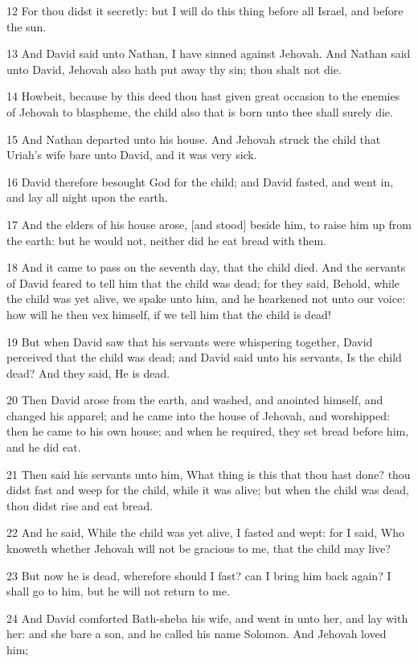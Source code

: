 \par 12 For thou didst it secretly: but I will do this thing before all Israel, and before the sun.
\par 13 And David said unto Nathan, I have sinned against Jehovah. And Nathan said unto David, Jehovah also hath put away thy sin; thou shalt not die.
\par 14 Howbeit, because by this deed thou hast given great occasion to the enemies of Jehovah to blaspheme, the child also that is born unto thee shall surely die.
\par 15 And Nathan departed unto his house. And Jehovah struck the child that Uriah's wife bare unto David, and it was very sick.
\par 16 David therefore besought God for the child; and David fasted, and went in, and lay all night upon the earth.
\par 17 And the elders of his house arose, [and stood] beside him, to raise him up from the earth: but he would not, neither did he eat bread with them.
\par 18 And it came to pass on the seventh day, that the child died. And the servants of David feared to tell him that the child was dead; for they said, Behold, while the child was yet alive, we spake unto him, and he hearkened not unto our voice: how will he then vex himself, if we tell him that the child is dead!
\par 19 But when David saw that his servants were whispering together, David perceived that the child was dead; and David said unto his servants, Is the child dead? And they said, He is dead.
\par 20 Then David arose from the earth, and washed, and anointed himself, and changed his apparel; and he came into the house of Jehovah, and worshipped: then he came to his own house; and when he required, they set bread before him, and he did eat.
\par 21 Then said his servants unto him, What thing is this that thou hast done? thou didst fast and weep for the child, while it was alive; but when the child was dead, thou didst rise and eat bread.
\par 22 And he said, While the child was yet alive, I fasted and wept: for I said, Who knoweth whether Jehovah will not be gracious to me, that the child may live?
\par 23 But now he is dead, wherefore should I fast? can I bring him back again? I shall go to him, but he will not return to me.
\par 24 And David comforted Bath-sheba his wife, and went in unto her, and lay with her: and she bare a son, and he called his name Solomon. And Jehovah loved him;
